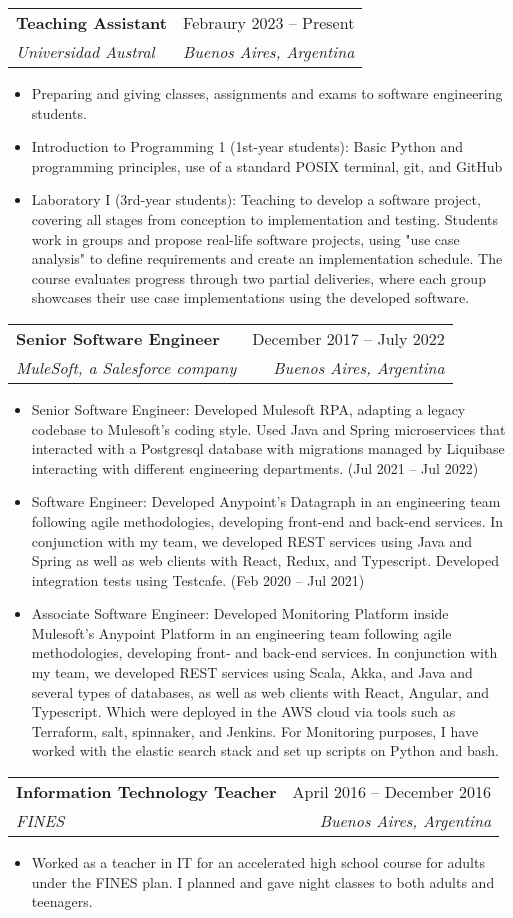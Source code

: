\documentclass[letterpaper,11pt]{article}
\makeatletter
\newcommand{\resumeItem}[1]{
  \item\small{
    {#1 \vspace{-2pt}}
  }
}
\newcommand{\resumeSubheading}[4]{
  \vspace{-2pt}\item
    \begin{tabular*}{0.97\textwidth}[t]{l@{\extracolsep{\fill}}r}
      \textbf{#1} & #2 \\
      \textit{\small#3} & \textit{\small #4} \\
    \end{tabular*}\vspace{-7pt}
}
\newcommand{\resumeItemListStart}{\begin{itemize}}
\newcommand{\resumeItemListEnd}{\end{itemize}\vspace{-5pt}}
\makeatother
\begin{document}
    \resumeSubheading
      {Teaching Assistant}{Febraury 2023 -- Present}
      {Universidad Austral}{Buenos Aires, Argentina}
      \resumeItemListStart
        \resumeItem{Preparing and giving classes, assignments and exams to software engineering students.}
        \resumeItem{Introduction to Programming 1 (1st-year students): Basic Python and programming principles, use of a standard POSIX terminal, git, and GitHub}
        \resumeItem{Laboratory I (3rd-year students):
        Teaching to develop a software project, covering all stages from conception to implementation and testing. Students work in groups and propose real-life software projects, using "use case analysis" to define requirements and create an implementation schedule. The course evaluates progress through two partial deliveries, where each group showcases their use case implementations using the developed software.}
        \resumeItemListEnd

    \resumeSubheading
      {Senior Software Engineer}{December 2017 -- July 2022}
      {MuleSoft, a Salesforce company}{Buenos Aires, Argentina}
      \resumeItemListStart
        \resumeItem{Senior Software Engineer: Developed Mulesoft RPA, adapting a legacy codebase to Mulesoft's coding style. Used Java and Spring microservices that interacted with a Postgresql database with migrations managed by Liquibase interacting with different engineering departments. (Jul 2021 -- Jul 2022)}
        \resumeItem{Software Engineer: Developed Anypoint's Datagraph in an engineering team following agile methodologies, developing front-end and back-end services. In conjunction with my team, we developed REST services using Java and Spring as well as web clients with React, Redux, and Typescript. Developed integration tests using Testcafe. (Feb 2020 -- Jul 2021)}
        \resumeItem{Associate Software Engineer: Developed Monitoring Platform inside Mulesoft's Anypoint Platform in an engineering team following agile methodologies, developing front- and back-end services. In conjunction with my team, we developed REST services using Scala, Akka, and Java and several types of databases, as well as web clients with React, Angular, and Typescript. Which were deployed in the AWS cloud via tools such as Terraform, salt, spinnaker, and Jenkins. For Monitoring purposes, I have worked with the elastic search stack and set up scripts on Python and bash.}
    \resumeItemListEnd

    \resumeSubheading
      {Information Technology Teacher}{April 2016 -- December 2016}
      {FINES}{Buenos Aires, Argentina}
      \resumeItemListStart
        \resumeItem{Worked as a teacher in IT for an accelerated high school course for adults under the FINES plan. I planned and gave night classes to both adults and teenagers.}
      \resumeItemListEnd
\end{document}
